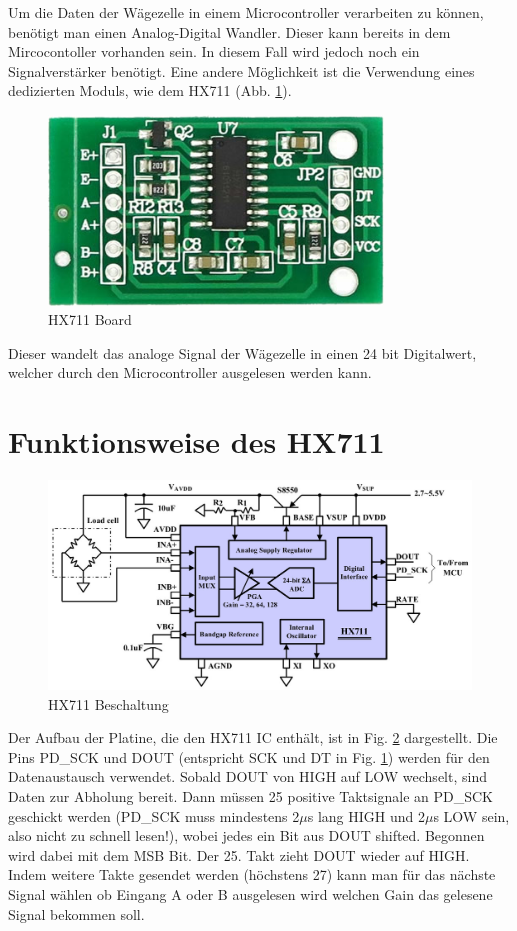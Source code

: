 \documentclass[12pt,journal]{IEEEtran}
\begin{document}
Um die Daten der Wägezelle in einem Microcontroller verarbeiten zu können, benötigt man einen Analog-Digital Wandler.
Dieser kann bereits in dem Mircocontoller vorhanden sein.
In diesem Fall wird jedoch noch ein Signalverstärker benötigt.
Eine andere Möglichkeit ist die Verwendung eines dedizierten Moduls, wie dem HX711 \cite{hx711sheet} (Abb. \ref{fig_HX711_board}).
\begin{figure}[h]
  \centering
    \includegraphics[width=3.5in]{images/HX711Board.jpeg}
    \caption{HX711 Board}
  \label{fig_HX711_board}
\end{figure}
Dieser wandelt das analoge Signal der Wägezelle in einen 24 bit Digitalwert, welcher durch den Microcontroller ausgelesen werden kann.

\section{Funktionsweise des HX711}

\begin{figure}[htbp]
\centering
\includegraphics[width=7in]{images/HX711.jpg}%
\caption{HX711 Beschaltung}
\label{fig_HX711}
\end{figure}

Der Aufbau der Platine, die den  HX711 IC enthält, ist in Fig. \ref{fig_HX711} dargestellt.
Die Pins PD\_SCK und DOUT (entspricht SCK und DT in Fig. \ref{fig_HX711_board}) werden für den Datenaustausch
verwendet. Sobald DOUT von HIGH auf LOW wechselt, sind Daten zur Abholung bereit.
Dann müssen 25 positive Taktsignale an PD\_SCK geschickt werden (PD\_SCK muss mindestens 2$\mu$s lang
HIGH und 2$\mu$s LOW sein, also nicht zu schnell lesen!), wobei jedes ein Bit aus DOUT shifted.
Begonnen wird dabei mit dem MSB Bit. Der 25. Takt zieht DOUT wieder auf HIGH.
Indem weitere Takte gesendet werden (höchstens 27) kann man für das nächste Signal wählen
ob Eingang A oder B ausgelesen wird welchen Gain das gelesene Signal bekommen soll. 
\end{document}
